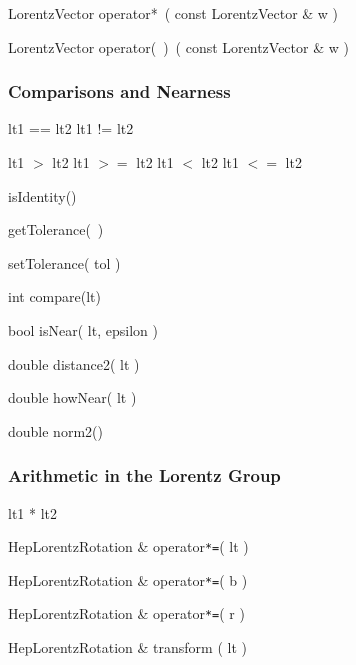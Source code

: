 \begin{shortlist}
  \item LorentzVector operator*~( const LorentzVector \& w ) 
  \item LorentzVector operator(~)~( const LorentzVector \& w ) 
\end{shortlist}

\subsubsection{Comparisons and Nearness}

\begin{shortlist}
  \item lt1 == lt2 \/\/\/ lt1 != lt2 		\see{\ref{eq:ltexact}}
  \item lt1 $>$ lt2 \/\/\/ lt1 $>=$ lt2 \/\/\/ lt1 $<$ lt2 \/\/\/ lt1 $<=$ lt2
						\see{\ref{eq:ltorder}}
  \item isIdentity()
\end{shortlist}


\begin{shortlist}
  \item getTolerance(~)	\see{\ref{eq:epsildefR}}
  \item setTolerance( tol )
  \item int compare(lt)				\see{\ref{eq:ltorder}}
  \item bool isNear( lt, epsilon )		\see{\ref{eq:nearboost},
						     \ref{eq:isnearLT}}
  \item double distance2( lt ) 			\see{\ref{eq:hownearboost}, 
						     \ref{eq:isnearLT}}
  \item double howNear( lt ) 			\see{\ref{eq:hownearboost}, 
						     \ref{eq:isnearLT}}
  \item double norm2()				\see{\ref{eq:boostnorm2},
						     \ref{eq:ltnorm2}}
\end{shortlist}

\subsubsection{Arithmetic in the Lorentz Group}

\begin{shortlist}
  \item lt1 * lt2
  \item HepLorentzRotation \& operator\verb$*=$( lt )
  \item HepLorentzRotation \& operator\verb$*=$( b )
  \item HepLorentzRotation \& operator\verb$*=$( r )
  \item HepLorentzRotation \& transform ( lt )  	\see{\ref{eq:lttrans}}
\end{shortlist}

